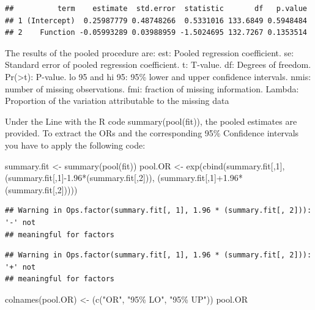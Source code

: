 \documentclass[
]{book}
\newenvironment{Shaded}{\begin{snugshade}}{\end{snugshade}}
\newcommand{\DecValTok}[1]{\textcolor[rgb]{0.00,0.00,0.81}{#1}}
\newcommand{\FloatTok}[1]{\textcolor[rgb]{0.00,0.00,0.81}{#1}}
\newcommand{\FunctionTok}[1]{\textcolor[rgb]{0.00,0.00,0.00}{#1}}
\newcommand{\NormalTok}[1]{#1}
\newcommand{\OtherTok}[1]{\textcolor[rgb]{0.56,0.35,0.01}{#1}}
\newcommand{\SpecialCharTok}[1]{\textcolor[rgb]{0.00,0.00,0.00}{#1}}
\newcommand{\StringTok}[1]{\textcolor[rgb]{0.31,0.60,0.02}{#1}}
\begin{document}
\begin{verbatim}
##          term    estimate  std.error  statistic       df   p.value
## 1 (Intercept)  0.25987779 0.48748266  0.5331016 133.6849 0.5948484
## 2    Function -0.05993289 0.03988959 -1.5024695 132.7267 0.1353514
\end{verbatim}

The results of the pooled procedure are:
est: Pooled regression coefficient.
se: Standard error of pooled regression coefficient.
t: T-value.
df: Degrees of freedom.
Pr(\textgreater\textbar t\textbar): P-value.
lo 95 and hi 95: 95\% lower and upper confidence intervals.
nmis: number of missing observations.
fmi: fraction of missing information.
Lambda: Proportion of the variation attributable to the missing data

Under the Line with the R code summary(pool(fit)), the pooled estimates are provided. To extract the ORs and the corresponding 95\% Confidence intervals you have to apply the following code:

\begin{Shaded}
\begin{Highlighting}[]
\NormalTok{summary.fit }\OtherTok{\textless{}{-}} \FunctionTok{summary}\NormalTok{(}\FunctionTok{pool}\NormalTok{(fit))}
\NormalTok{pool.OR }\OtherTok{\textless{}{-}} \FunctionTok{exp}\NormalTok{(}\FunctionTok{cbind}\NormalTok{(summary.fit[,}\DecValTok{1}\NormalTok{], (summary.fit[,}\DecValTok{1}\NormalTok{]}\SpecialCharTok{{-}}\FloatTok{1.96}\SpecialCharTok{*}\NormalTok{(summary.fit[,}\DecValTok{2}\NormalTok{])), }
\NormalTok{           (summary.fit[,}\DecValTok{1}\NormalTok{]}\SpecialCharTok{+}\FloatTok{1.96}\SpecialCharTok{*}\NormalTok{(summary.fit[,}\DecValTok{2}\NormalTok{]))))}
\end{Highlighting}
\end{Shaded}

\begin{verbatim}
## Warning in Ops.factor(summary.fit[, 1], 1.96 * (summary.fit[, 2])): '-' not
## meaningful for factors
\end{verbatim}

\begin{verbatim}
## Warning in Ops.factor(summary.fit[, 1], 1.96 * (summary.fit[, 2])): '+' not
## meaningful for factors
\end{verbatim}

\begin{Shaded}
\begin{Highlighting}[]
\FunctionTok{colnames}\NormalTok{(pool.OR) }\OtherTok{\textless{}{-}}\NormalTok{ (}\FunctionTok{c}\NormalTok{(}\StringTok{"OR"}\NormalTok{, }\StringTok{"95\% LO"}\NormalTok{, }\StringTok{"95\% UP"}\NormalTok{))}
\NormalTok{pool.OR}
\end{Highlighting}
\end{Shaded}
\end{document}
